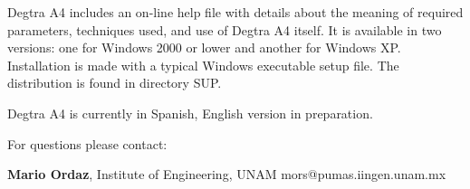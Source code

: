 Degtra A4 includes an on-line help file with details about the meaning of required parameters, techniques used, and use of Degtra A4 itself. It is available in two versions: one for Windows 2000 or lower and another for Windows XP. Installation is made with a typical Windows executable setup file. The distribution is found in directory SUP. 

Degtra A4 is currently in Spanish, English version in preparation. 

For questions please contact: 

\textbf{Mario Ordaz}, Institute of Engineering, UNAM \newline
mors@pumas.iingen.unam.mx 

